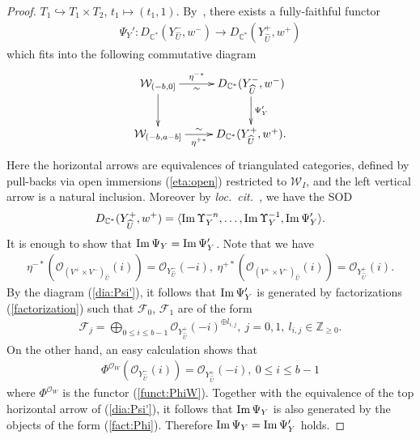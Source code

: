 \documentclass[11pt]{amsart}
\theoremstyle{plain}
\newcommand{\fF}{\mathcal{F}}
\newcommand{\oO}{\mathcal{O}}
\newcommand{\wW}{\mathcal{W}}
\newcommand{\Imm}{\mathop{\rm Im}\nolimits}
\begin{document}
\begin{proof}
$T_1 \hookrightarrow T_1 \times T_2$, 
$t_1 \mapsto (t_1, 1)$. 
By~\cite[Theorem~3.5.2]{BFK2}, 
there exists a fully-faithful functor
\begin{align*}
\Psi_Y' \colon D_{\mathbb{C}^{\ast}}(Y^-_{\widehat{U}}, w^-)
\to
D_{\mathbb{C}^{\ast}}(Y_{\widehat{U}}^+, w^+)
\end{align*}
which fits into the following commutative diagram
\begin{align}\label{dia:Psi'}
\xymatrix{
\wW_{(-b, 0]} \ar[r]^-{\eta^{-\ast}}_-{\sim} \ar[d]  & D_{\mathbb{C}^{\ast}}(Y_{\widehat{U}}^-, w^-) \ar[d]^-{\Psi_Y'} \\
\wW_{(-b, a-b]} \ar[r]_-{\eta^{+\ast}}^-{\sim} & 
D_{\mathbb{C}^{\ast}}(Y_{\widehat{U}}^+, w^+).
}
\end{align}
Here the horizontal arrows are equivalences of
triangulated categories, 
defined by pull-backs via open 
immersions (\ref{eta:open}) restricted to 
$\wW_I$, and 
the left vertical arrow is a natural 
inclusion. 
Moreover by \textit{loc.~cit.~}, we have the SOD
\begin{align*}
D_{\mathbb{C}^{\ast}}(Y_{\widehat{U}}^+, w^+)
=\langle \Imm \Upsilon_Y^{-n}, \ldots, \Imm \Upsilon_Y^{-1}, 
\Imm \Psi_Y' \rangle. 
\end{align*}
It is enough to show that 
$\Imm \Psi_Y=\Imm \Psi_Y'$. 
Note that we have
\begin{align*}
\eta^{-\ast}(\oO_{(V^+ \times V^-)_{\widehat{U}}}(i))=\oO_{Y_{\widehat{U}}^-}(-i), \ 
\eta^{+\ast}(\oO_{(V^+ \times V^-)_{\widehat{U}}}(i))
=\oO_{Y_{\widehat{U}}^+}(i).
\end{align*}
By the diagram (\ref{dia:Psi'}),
it follows that $\Imm \Psi_Y'$ is 
generated by 
factorizations (\ref{factorization})
such that 
$\fF_0$, $\fF_1$ are of the form
\begin{align*}
\fF_j=\bigoplus_{0 \le i\le b-1} \oO_{Y_{\widehat{U}}^+}(-i)^{\oplus l_{i, j}}, \ 
j=0, 1, \ l_{i, j} \in \mathbb{Z}_{\ge 0}. 
\end{align*}
On the other hand, 
an easy calculation shows that
\begin{align}\label{fact:Phi}
\Phi^{\oO_W}(\oO_{Y_{\widehat{U}}^-}(i))=\oO_{Y_{\widehat{U}}^+}(-i), \ 
0 \le i\le b-1
\end{align}
where $\Phi^{\oO_W}$ is the functor (\ref{funct:PhiW}). 
Together with the equivalence of the top horizontal arrow of (\ref{dia:Psi'}), 
it follows that $\Imm \Psi_Y$ is also generated by the objects of the form (\ref{fact:Phi}). 
Therefore $\Imm \Psi_Y=\Imm \Psi_Y'$ holds. 

\end{proof}
\end{document}
